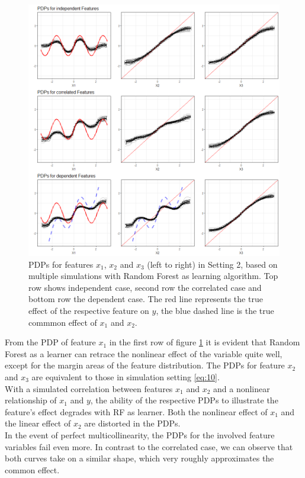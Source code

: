 \documentclass[]{krantz}
\begin{document}
\begin{figure}

\includegraphics[width=1\linewidth]{images/VK_PDP_17_Set2_RF} \hfill{}

\caption{PDPs for features $x_1$, $x_2$ and $x_3$ (left to right) in Setting 2, based on multiple simulations with Random Forest as learning algorithm. Top row shows independent case, second row the correlated case and bottom row the dependent case. The red line represents the true effect of the respective feature on $y$, the blue dashed line is the true commmon effect of $x_1$ and $x_2$.}\label{fig:Figure17}
\end{figure}

From the PDP of feature \(x_1\) in the first row of figure
\ref{fig:Figure17} it is evident that Random Forest as a learner can
retrace the nonlinear effect of the variable quite well, except for the
margin areas of the feature distribution. The PDPs for feature \(x_2\)
and \(x_3\) are equivalent to those in simulation setting \eqref{eq:10}.\\
With a simulated correlation between features \(x_1\) and \(x_2\) and a
nonlinear relationship of \(x_1\) and \(y\), the ability of the
respective PDPs to illustrate the feature's effect degrades with RF as
learner. Both the nonlinear effect of \(x_1\) and the linear effect of
\(x_2\) are distorted in the PDPs.\\
In the event of perfect multicollinearity, the PDPs for the involved
feature variables fail even more. In contrast to the correlated case, we
can observe that both curves take on a similar shape, which very roughly
approximates the common effect.
\end{document}
